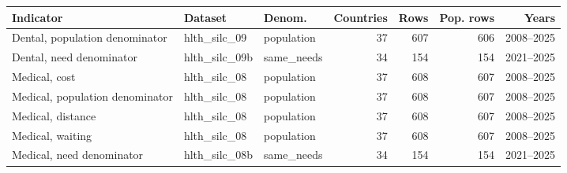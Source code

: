 \begingroup
\setlength{\tabcolsep}{4pt}
\renewcommand{\arraystretch}{1.12}
\begin{tabularx}{\textwidth}{@{}Yllrrrr@{}}
\toprule
Indicator & Dataset & Denom. & Countries & Rows & Pop. rows & Years \\
\midrule
Dental, population denominator & hlth\_silc\_09 & population & 37 & 607 & 606 & 2008--2025 \\
Dental, need denominator & hlth\_silc\_09b & same\_needs & 34 & 154 & 154 & 2021--2025 \\
Medical, cost & hlth\_silc\_08 & population & 37 & 608 & 607 & 2008--2025 \\
Medical, population denominator & hlth\_silc\_08 & population & 37 & 608 & 607 & 2008--2025 \\
Medical, distance & hlth\_silc\_08 & population & 37 & 608 & 607 & 2008--2025 \\
Medical, waiting & hlth\_silc\_08 & population & 37 & 608 & 607 & 2008--2025 \\
Medical, need denominator & hlth\_silc\_08b & same\_needs & 34 & 154 & 154 & 2021--2025 \\
\bottomrule
\end{tabularx}
\endgroup
